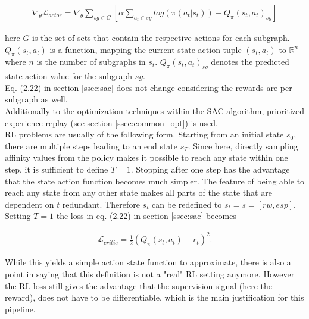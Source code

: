 \begin{align}
	\nabla_\theta \bar{\mathcal{L}}_{actor} = \nabla_\theta \sum_{sg \in G} \left[ \alpha \sum_{a_t\in sg}log(\pi(a_t|s_t)) - Q_\pi(s_t, a_t)_{sg} \right]
\end{align}

here $G$ is the set of sets that contain the respective actions for each subgraph. $Q_\pi(s_t, a_t)$ is a function, mapping the current state action tuple $(s_t, a_t)$ to $\mathbb{R}^n$ where $n$ is the number of subgraphs in $s_t$. $Q_\pi(s_t, a_t)_{sg}$ denotes the predicted state action value for the subgraph $sg$.\\
Eq. (2.22) in section \ref{ssec:sac} does not change considering the rewards are per subgraph as well.\\
Additionally to the optimization techniques within the SAC algorithm, prioritized experience replay (see section \ref{ssec:common_opt}) is used.\\
RL problems are usually of the following form. Starting from an initial state $s_0$, there are multiple steps leading to an end state $s_T$. Since here, directly sampling affinity values from the policy makes it possible to reach any state within one step, it is sufficient to define $T=1$. Stopping after one step has the advantage that the state action function becomes much simpler. The feature of being able to reach any state from any other state makes all parts of the state that are dependent on $t$ redundant. Therefore $s_t$ can be redefined to $s_t=s=[rw, esp]$.\\
Setting $T=1$ the loss in eq. (2.22) in section \ref{ssec:sac} becomes

\begin{align}
	\mathcal{L}_{critic} = \frac{1}{2}(Q_{\pi}(s_t, a_t) - r_t) ^ 2 .
\end{align}

While this yields a simple action state function to approximate, there is also a point in saying that this definition is not a "real" RL setting anymore. However the RL loss still gives the advantage that the supervision signal (here the reward), does not have to be differentiable, which is the main justification for this pipeline.